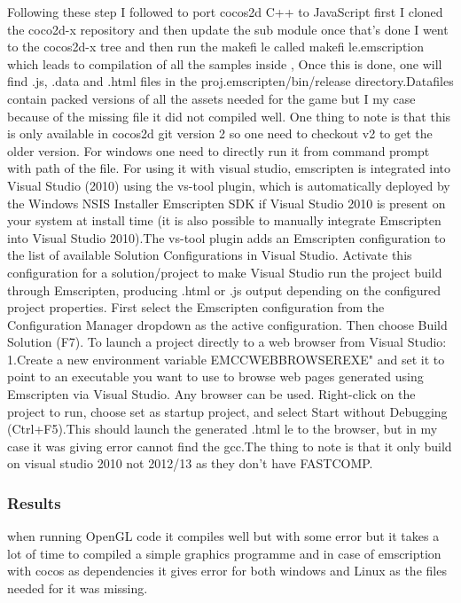 \documentclass[23pt]{article}
\begin{document}
{\Large Following these step I followed to port cocos2d C++ to JavaScript first I cloned the coco2d-x repository and then update the sub module once that’s done I went  to the cocos2d-x tree and then run the makefi le called makefi le.emscription which leads to compilation of all the samples inside , Once this is  done, one will find .js, .data and .html files in the proj.emscripten/bin/release directory.Datafiles contain packed versions of all the assets needed for the game but I my case because of the missing file it did not compiled well. One thing to note is that this is only available in cocos2d git version 2 so one need to checkout v2 to get the older version. For windows one need to directly run it from command prompt with path of the file. For using it with visual studio, emscripten is integrated into Visual Studio (2010) using the vs-tool plugin, which is automatically deployed by the Windows NSIS Installer Emscripten SDK if Visual Studio 2010 is present on your system at install time (it is also possible to manually integrate Emscripten into Visual Studio 2010).The vs-tool plugin adds an Emscripten configuration to the list of available Solution Configurations in Visual Studio. Activate this configuration for a solution/project to make Visual Studio run the project build through Emscripten, producing .html or .js output depending on the configured project properties. First select the Emscripten configuration from the Configuration Manager dropdown as the active configuration. Then choose Build Solution (F7). To launch a project directly to a web browser from Visual Studio: 1.Create a new environment variable EMCCWEBBROWSEREXE" and set it to point to an executable you want to use to browse web pages generated using Emscripten via Visual Studio. Any browser can be used. Right-click on the project to run, choose set as startup project, and select Start without Debugging (Ctrl+F5).This should launch the generated .html le to the browser, but in my case it was giving error cannot find the gcc.The thing to note is that it only build on visual studio 2010 not 2012/13 as they don’t have FASTCOMP. \par}

\subsubsection{Results}

{\Large when running OpenGL code it compiles well but with some error but it takes a lot of time to compiled a simple graphics programme and in case of emscription with cocos as dependencies it gives error for both windows and Linux as the files needed for it was missing. \par}
\end{document}

